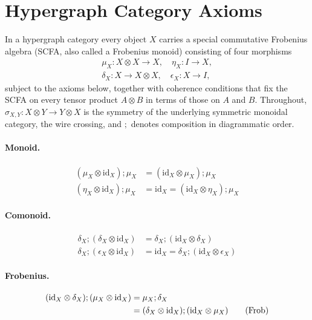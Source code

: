 \section{Hypergraph Category Axioms}\label{sec:axioms}

In a hypergraph category every object $X$ carries a special commutative
Frobenius algebra (SCFA, also called a Frobenius monoid) consisting of four morphisms
\begin{gather*}
  \mu_X \colon X \otimes X \to X,\quad
  \eta_X \colon I \to X,\\
  \delta_X \colon X \to X \otimes X,\quad
  \epsilon_X \colon X \to I,
\end{gather*}
subject to the axioms below, together with coherence conditions that fix the
SCFA on every tensor product $A \otimes B$ in terms of those on $A$ and $B$.
Throughout, $\sigma_{X,Y}\colon X\otimes Y\to Y\otimes X$ is the symmetry of the underlying
symmetric monoidal category, the wire crossing, and $;$ denotes composition in diagrammatic order.

\paragraph{Monoid.}
\begin{align}
  (\mu_X \otimes \mathrm{id}_X) ; \mu_X
    &= (\mathrm{id}_X \otimes \mu_X) ; \mu_X
    \label{eq:ax-assoc}
    \tag{assoc}\\
  (\eta_X \otimes \mathrm{id}_X) ; \mu_X
    &= \mathrm{id}_X
    = (\mathrm{id}_X \otimes \eta_X) ; \mu_X
    \label{eq:ax-unit}
    \tag{unit}
\end{align}

\paragraph{Comonoid.}
\begin{align}
  \delta_X ; (\delta_X \otimes \mathrm{id}_X)
    &= \delta_X ; (\mathrm{id}_X \otimes \delta_X)
    \label{eq:ax-coassoc}
    \tag{coassoc}\\
  \delta_X ; (\epsilon_X \otimes \mathrm{id}_X)
    &= \mathrm{id}_X
    = \delta_X ; (\mathrm{id}_X \otimes \epsilon_X)
    \label{eq:ax-counit}
    \tag{counit}
\end{align}

\paragraph{Frobenius.}
\begin{align}
  (\mathrm{id}_X \otimes \delta_X) ; (\mu_X \otimes \mathrm{id}_X)
    &= \mu_X ; \delta_X\notag\\
    &= (\delta_X \otimes \mathrm{id}_X) ; (\mathrm{id}_X \otimes \mu_X)
    \label{eq:ax-frob}
    \tag{Frob}
\end{align}

